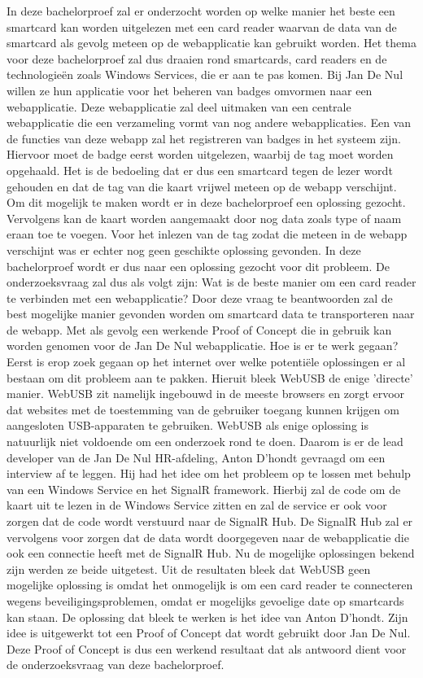 In deze bachelorproef zal er onderzocht worden op welke manier het beste een smartcard kan worden uitgelezen met een card reader waarvan de data van de smartcard als gevolg meteen op de webapplicatie kan gebruikt worden. Het thema voor deze bachelorproef zal dus draaien rond smartcards, card readers en de technologieën zoals Windows Services, die er aan te pas komen. Bij Jan De Nul willen ze hun applicatie voor het beheren van badges omvormen naar een webapplicatie. Deze webapplicatie zal deel uitmaken van een centrale webapplicatie die een verzameling vormt van nog andere webapplicaties. Een van de functies van deze webapp zal het registreren van badges in het systeem zijn. Hiervoor moet de badge eerst worden uitgelezen, waarbij de tag moet worden opgehaald. Het is de bedoeling dat er dus een smartcard tegen de lezer wordt gehouden en dat de tag van die kaart vrijwel meteen op de webapp verschijnt. Om dit mogelijk te maken wordt er in deze bachelorproef een oplossing gezocht. Vervolgens kan de kaart worden aangemaakt door nog data zoals type of naam eraan toe te voegen.
Voor het inlezen van de tag zodat die meteen in de webapp verschijnt was er echter nog geen geschikte oplossing gevonden. In deze bachelorproef wordt er dus naar een oplossing gezocht voor dit probleem. De onderzoeksvraag zal dus als volgt zijn: Wat is de beste manier om een card reader te verbinden met een webapplicatie? Door deze vraag te beantwoorden zal de best mogelijke manier gevonden worden om smartcard data te transporteren naar de webapp. Met als gevolg een werkende Proof of Concept die in gebruik kan worden genomen voor de Jan De Nul webapplicatie.
Hoe is er te werk gegaan? Eerst is erop zoek gegaan op het internet over welke potentiële oplossingen er al bestaan om dit probleem aan te pakken. Hieruit bleek WebUSB de enige 'directe' manier. WebUSB zit namelijk ingebouwd in de meeste browsers en zorgt ervoor dat websites met de toestemming van de gebruiker toegang kunnen krijgen om aangesloten USB-apparaten te gebruiken. WebUSB als enige oplossing is natuurlijk niet voldoende om een onderzoek rond te doen. Daarom is er de lead developer van de Jan De Nul HR-afdeling, Anton D'hondt gevraagd om een interview af te leggen. Hij had het idee om het probleem op te lossen met behulp van een Windows Service en het SignalR framework. Hierbij zal de code om de kaart uit te lezen in de Windows Service zitten en zal de service er ook voor zorgen dat de code wordt verstuurd naar de SignalR Hub. De SignalR Hub zal er vervolgens voor zorgen dat de data wordt doorgegeven naar de webapplicatie die ook een connectie heeft met de SignalR Hub. Nu de mogelijke oplossingen bekend zijn werden ze beide uitgetest. 
Uit de resultaten bleek dat WebUSB geen mogelijke oplossing is omdat het onmogelijk is om een card reader te connecteren wegens beveiligingsproblemen, omdat er mogelijks gevoelige date op smartcards kan staan. De oplossing dat bleek te werken is het idee van Anton D'hondt. Zijn idee is uitgewerkt tot een Proof of Concept dat wordt gebruikt door Jan De Nul. Deze Proof of Concept is dus een werkend resultaat dat als antwoord dient voor de onderzoeksvraag van deze bachelorproef.
